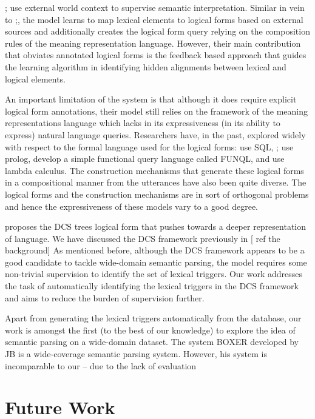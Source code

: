 \documentclass[11pt]{article}
\begin{document}
\cite{CGCR10};\cite{CGRR11} use external world context to supervise semantic interpretation. Similar in vein to \cite{CM08};\cite{LJK09}, the \cite{CGCR10} model learns to map lexical elements to logical forms based on external sources and additionally creates the logical form query relying on the composition rules of the meaning representation language. However, their main contribution that obviates annotated logical forms is the feedback based approach that guides the learning algorithm in identifying hidden alignments between lexical and logical elements.

An important limitation of the \cite{CGCR10} system is that although it does require explicit logical form annotations, their model still relies on the framework of the meaning representations language which lacks in its expressiveness (in its ability to express) natural language queries. Researchers have, in the past, explored widely with respect to the formal language used for the logical forms: \cite{GM09} use SQL, \cite{ZM96};\cite{TM01} use prolog, \cite{KWM05}  develop a simple functional query language called {\sc FUN}QL, and \cite{ZC05} use lambda calculus. The construction mechanisms that generate these logical forms in a compositional manner from the utterances have also been quite diverse. The logical forms and the construction mechanisms are in sort of orthogonal problems and hence the expressiveness of these models vary to a good degree.

\cite{LJK11} proposes the DCS trees logical form that pushes towards a deeper representation of language. %
We have discussed the DCS framework previously in [ ref the background]
As mentioned before, although the DCS framework appears to be a good candidate to tackle wide-domain semantic parsing, the model requires some non-trivial supervision to identify the set of lexical triggers.
Our work addresses the task of automatically identifying the lexical triggers in the DCS framework and aims to reduce the burden of supervision further.

Apart from generating the lexical triggers automatically from the database, our work is amongst the first (to the best of our knowledge) to explore the idea of semantic parsing on a wide-domain dataset. The system {\sc BOXER} developed by JB is a wide-coverage semantic parsing system. However, his system is incomparable to our -- due to the lack of evaluation


\section{Future Work}
\end{document}
